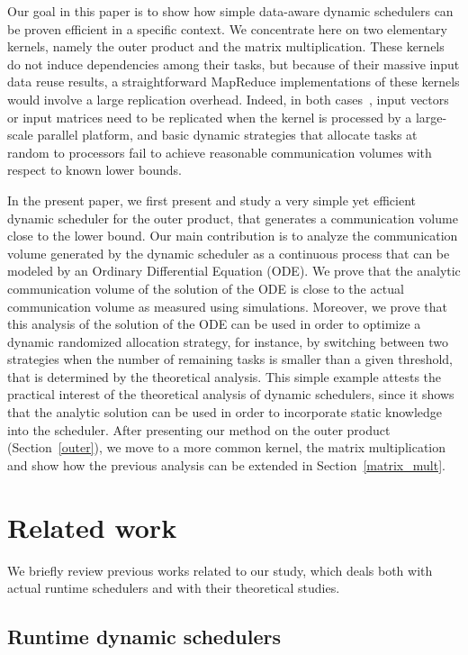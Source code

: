 \documentclass[a4paper,10pt]{article}
\newcommand{\mapreduce}{MapReduce\xspace}
\begin{document}
Our goal in this paper is to show how simple data-aware dynamic
schedulers can be proven efficient in a specific context. We
concentrate here on two elementary kernels, namely the outer product
and the matrix multiplication. These kernels do not induce
dependencies among their tasks, but because of their massive input data reuse results,
a straightforward \mapreduce implementations of these
kernels would involve a large replication overhead.  Indeed, in both
cases~\cite{nofreelunch}, input vectors or input matrices need to be
replicated when the kernel is processed by a large-scale parallel
platform, and basic dynamic strategies that allocate tasks at random
to processors fail to achieve reasonable communication volumes with
respect to known lower bounds.

In the present paper, we first present and study a very simple yet
efficient dynamic scheduler for the outer
product, that generates a communication volume close to the lower
bound. Our main contribution is to analyze the communication volume
generated by the dynamic scheduler as a continuous process that can be
modeled by an Ordinary Differential Equation (ODE). We prove that the
analytic communication volume of the solution of the ODE is close to
the actual communication volume as measured using
simulations. Moreover, we prove that this analysis of the solution of
the ODE can be used in order to optimize a dynamic randomized allocation strategy, for
instance, by switching between two strategies when the number of
remaining tasks is smaller than a given threshold, that is determined by the theoretical analysis. This simple example
attests the practical interest of the theoretical analysis of dynamic
schedulers, since it shows that the analytic solution can be used in
order to incorporate static knowledge into the scheduler.  After
presenting our method on the outer product (Section~\ref{outer}),
we move to a more common kernel, the matrix multiplication and show how the
previous analysis can be extended in Section~\ref{matrix_mult}.


\section{Related work}

We briefly review previous works related to our study, which deals both
with actual runtime schedulers and with their theoretical studies.

\subsection{Runtime dynamic schedulers}
\end{document}

